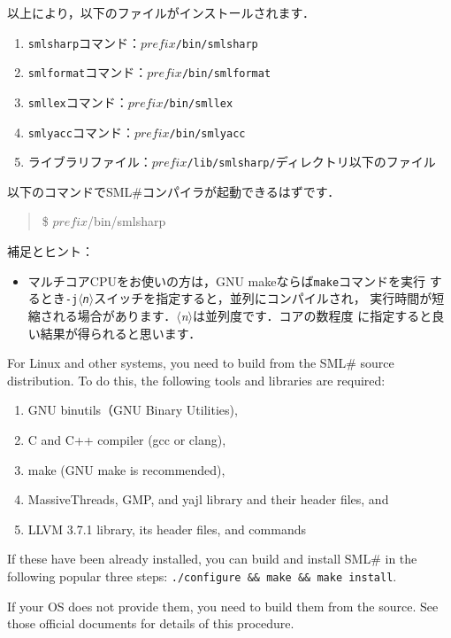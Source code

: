 \documentclass{jbook}
\newcommand{\smlsharp}{SML\#}
\newcommand{\nonterm}[1]{\mbox{$\langle$}{\it #1}\mbox{$\rangle$}}
\newenvironment{program}{\begin{quote}\begin{tt}}%
                        {\end{tt}\end{quote}}
\begin{document}
	以上により，以下のファイルがインストールされます．
\begin{enumerate}
\item {\tt smlsharp}コマンド：{\tt $\mathit{prefix}$/bin/smlsharp}
\item {\tt smlformat}コマンド：{\tt $\mathit{prefix}$/bin/smlformat}
\item {\tt smllex}コマンド：{\tt $\mathit{prefix}$/bin/smllex}
\item {\tt smlyacc}コマンド：{\tt $\mathit{prefix}$/bin/smlyacc}
\item ライブラリファイル：{\tt $\mathit{prefix}$/lib/smlsharp/}ディレクトリ以下のファイル
\end{enumerate}
以下のコマンドで\smlsharp{}コンパイラが起動できるはずです．
\begin{program}
\$ $\mathit{prefix}$/bin/smlsharp
\end{program}

補足とヒント：
\begin{itemize}
\item マルチコアCPUをお使いの方は，GNU makeならば{\tt make}コマンドを実行
するとき{\tt -j\nonterm{n}}スイッチを指定すると，並列にコンパイルされ，
実行時間が短縮される場合があります．\nonterm{n}は並列度です．コアの数程度
に指定すると良い結果が得られると思います．
\end{itemize}

\else%
	For Linux and other systems, you need to build from the
\smlsharp{} source distribution.
	To do this, the following tools and libraries are required:
\begin{enumerate}
\item GNU binutils（GNU Binary Utilities),
\item C and C++ compiler (gcc or clang),
\item make (GNU make is recommended),
\item MassiveThreads, GMP, and yajl library and their header files, and
\item LLVM 3.7.1 library, its header files, and commands
\end{enumerate}
	If these have been already installed, you can build and install
\smlsharp{} in the following popular three steps:
{\tt ./configure \&\& make \&\& make install}.

	If your OS does not provide them, you need to build them from the
source.
	See those official documents for details of this procedure.
\end{document}
